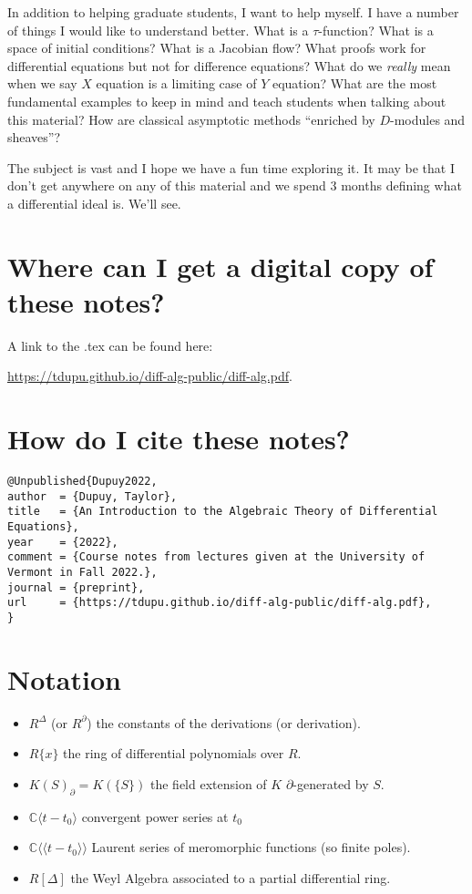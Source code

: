 \documentclass[]{book}
\numberwithin{equation}{section}
\theoremstyle{definition}
\theoremstyle{remark}
\newcommand{\CC}{\mathbb{C}}
\newcommand{\llangle}{\langle \langle}
\newcommand{\rrangle}{\rangle \rangle}
\begin{document}
In addition to helping graduate students, I want to help  myself.
I have a number of things I would like to understand better. What is a $\tau$-function? What is a space of initial conditions? 
What is a Jacobian flow? What proofs work for differential equations but not for difference equations? 
What do we \emph{really} mean when we say $X$ equation is a limiting case of $Y$ equation?
What are the most fundamental examples to keep in mind and teach students when talking about this material?
How are classical asymptotic methods ``enriched by $D$-modules and sheaves''?

The subject is vast and I hope we have a fun time exploring it. 
It may be that I don't get anywhere on any of this material and we spend 3 months defining what a differential ideal is. 
We'll see. 



\section{Where can I get a digital copy of these notes?}
A link to the .tex can be found here:
\begin{center}
	\url{https://tdupu.github.io/diff-alg-public/diff-alg.pdf}.
\end{center}

\section{How do I cite these notes?}

\begin{verbatim}
@Unpublished{Dupuy2022,
author  = {Dupuy, Taylor},
title   = {An Introduction to the Algebraic Theory of Differential Equations},
year    = {2022},
comment = {Course notes from lectures given at the University of Vermont in Fall 2022.},
journal = {preprint},
url     = {https://tdupu.github.io/diff-alg-public/diff-alg.pdf},
}

\end{verbatim}

\newpage 
\section{Notation}
\begin{itemize}
	\item $R^{\Delta}$ (or $R^{\partial}$) the constants of the derivations (or derivation). 
	\item $R\lbrace x \rbrace$ the ring of differential polynomials over $R$.
	\item $K(S)_{\partial} = K(\lbrace S \rbrace)$ the field extension of $K$ $\partial$-generated by $S$.
	\item $\CC\langle t-t_0 \rangle$ convergent power series at $t_0$
	\item $\CC\llangle t-t_0\rrangle$ Laurent series of meromorphic functions (so finite poles).
	\item $R[\Delta]$ the Weyl Algebra associated to a partial differential ring.
\end{itemize}
\newpage
\end{document}
